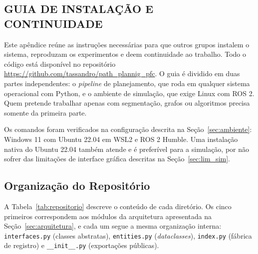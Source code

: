\documentclass[
    12pt,
    openright,
    oneside,
    a4paper,
    english,
    brazil
]{abntex2}
\begin{document}
\begin{apendicesenv}

\partapendices

\chapter{GUIA DE INSTALAÇÃO E CONTINUIDADE}
\label{ap:instalacao}
\sloppy
{}

Este apêndice reúne as instruções necessárias para que outros grupos instalem o sistema, reproduzam os experimentos e deem continuidade ao trabalho. Todo o código está disponível no repositório \url{https://github.com/tassandro/path_plannig_pfc}. O guia é dividido em duas partes independentes: o \textit{pipeline} de planejamento, que roda em qualquer sistema operacional com Python, e o ambiente de simulação, que exige Linux com ROS 2. Quem pretende trabalhar apenas com segmentação, grafos ou algoritmos precisa somente da primeira parte.

Os comandos foram verificados na configuração descrita na Seção~\ref{sec:ambiente}: Windows 11 com Ubuntu 22.04 em WSL2 e ROS 2 Humble. Uma instalação nativa do Ubuntu 22.04 também atende e é preferível para a simulação, por não sofrer das limitações de interface gráfica descritas na Seção~\ref{sec:lim_sim}.

\section{Organização do Repositório}

A Tabela~\ref{tab:repositorio} descreve o conteúdo de cada diretório. Os cinco primeiros correspondem aos módulos da arquitetura apresentada na Seção~\ref{sec:arquitetura}, e cada um segue a mesma organização interna: \texttt{interfaces.py} (classes abstratas), \texttt{entities.py} (\textit{dataclasses}), \texttt{index.py} (fábrica de registro) e \texttt{\_\_init\_\_.py} (exportações públicas).


\end{apendicesenv}
\end{document}

